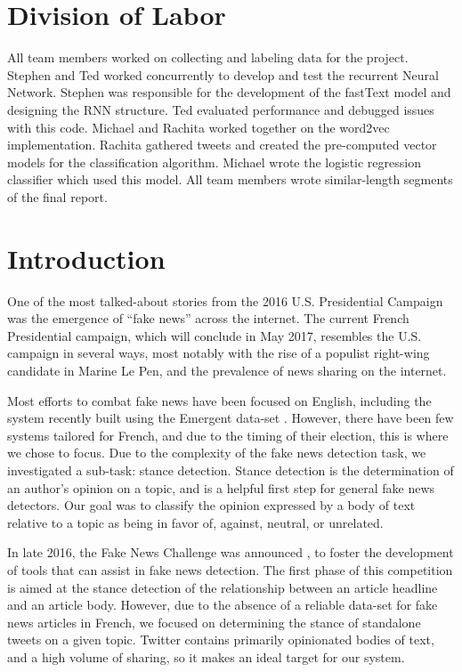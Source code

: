 \documentclass[journal]{IEEEtran}
\begin{document}
\section{Division of Labor}
All team members worked on collecting and labeling data for the project. Stephen and Ted worked concurrently to develop and test the recurrent Neural Network. Stephen was responsible for the development of the fastText model and designing the RNN structure. Ted evaluated performance and debugged issues with this code. Michael and Rachita worked together on the word2vec implementation. Rachita gathered tweets and created the pre-computed vector models for the classification algorithm. Michael wrote the logistic regression classifier which used this model. All team members wrote similar-length segments of the final report. 
\clearpage

\section{Introduction}
One of the most talked-about stories from the 2016 U.S. Presidential Campaign was the emergence of “fake news” across the internet. The current French Presidential campaign, which will conclude in May 2017, resembles the U.S. campaign in several ways, most notably with the rise of a populist right-wing candidate in Marine Le Pen, and the prevalence of news sharing on the internet. 

Most efforts to combat fake news have been focused on English, including the system recently built using the Emergent data-set \cite{ferreira_vlachos_2016}. However, there have been few systems tailored for French, and due to the timing of their election, this is where we chose to focus. Due to the complexity of the fake news detection task, we investigated a sub-task: stance detection. Stance detection is the determination of an author’s opinion on a topic, and is a helpful first step for general fake news detectors. Our goal was to classify the opinion expressed by a body of text relative to a topic as being in favor of, against, neutral, or unrelated.

In late 2016, the Fake News Challenge was announced \cite{fake_news_challenge}, to foster the development of tools that can assist in fake news detection. The first phase of this competition is aimed at the stance detection of the relationship between an article headline and an article body. However, due to the absence of a reliable data-set for fake news articles in French, we focused on determining the stance of standalone tweets on a given topic. Twitter contains primarily opinionated bodies of text, and a high volume of sharing, so it makes an ideal target for our system. 
\end{document}
